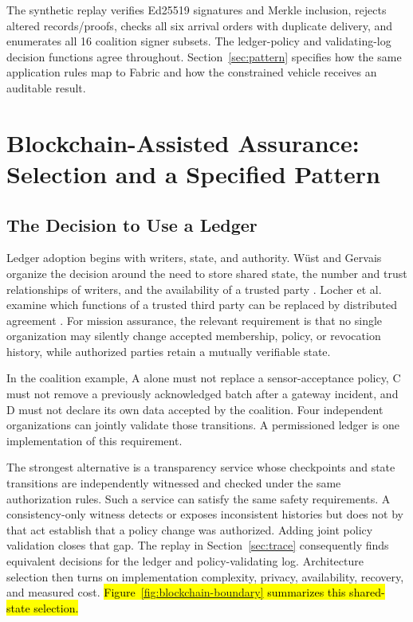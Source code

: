 \documentclass[blockchains,review,accept,moreauthors]{Definitions/mdpi}
\begin{document}
The synthetic replay verifies Ed25519 signatures and Merkle inclusion, rejects altered records/proofs, checks all six arrival orders with duplicate delivery, and enumerates all 16 coalition signer subsets. The ledger-policy and validating-log decision functions agree throughout. Section~\ref{sec:pattern} specifies how the same application rules map to Fabric and how the constrained vehicle receives an auditable result.



\section{Blockchain-Assisted Assurance: Selection and a Specified Pattern}

\subsection{The Decision to Use a Ledger}\label{sec:ledger-choice}

Ledger adoption begins with writers, state, and authority. W\"ust and Gervais organize the decision around the need to store shared state, the number and trust relationships of writers, and the availability of a trusted party \citep{wust2018need}. Locher et al. examine which functions of a trusted third party can be replaced by distributed agreement \citep{locher2018when}. For mission assurance, the relevant requirement is that no single organization may silently change accepted membership, policy, or revocation history, while authorized parties retain a mutually verifiable state.

In the coalition example, A alone must not replace a sensor-acceptance policy, C must not remove a previously acknowledged batch after a gateway incident, and D must not declare its own data accepted by the coalition. Four independent organizations can jointly validate those transitions. A permissioned ledger is one implementation of this requirement.

The strongest alternative is a transparency service whose checkpoints and state transitions are independently witnessed and checked under the same authorization rules. Such a service can satisfy the same safety requirements. A consistency-only witness detects or exposes inconsistent histories but does not by that act establish that a policy change was authorized. Adding joint policy validation closes that gap. The replay in Section~\ref{sec:trace} consequently finds equivalent decisions for the ledger and policy-validating log. Architecture selection then turns on implementation complexity, privacy, availability, recovery, and measured cost. \hl{Figure~{\ref{fig:blockchain-boundary}} summarizes this shared-state selection.}
\end{document}
